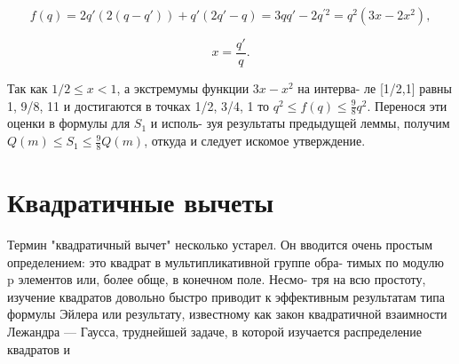 \begin{myproof}
$$f(q) = 2q'(2(q - q')) + q'(2q' - q) = 3qq' - 2q^{'2} = q^{2}(3x - 2x^{2}), $$ \par 
$$x = \frac{q'}{q}. $$ \par 

Так как $1/2 \leqslant x < 1$, а экстремумы функции $3x - x^{2}$ на интерва- \linebreak \indent ле [1/2,1] равны 1, 9/8, 11 и достигаются в точках 1/2, 3/4, 1 то \linebreak \indent $q^2 \leqslant f(q) \leqslant\frac{9}{8}q^{2}.$ Перенося эти оценки в формулы для $S_{1}$ и исполь- \linebreak \indent зуя результаты предыдущей леммы, получим $Q(m) \leqslant S_{1} \leqslant \frac{9}{8}Q(m)$, \linebreak \indent откуда и следует искомое утверждение. \par 
\end{myproof}
\section{Квадратичные вычеты}

Термин "квадратичный вычет" несколько устарел. Он вводится очень \linebreak простым определением: это квадрат в мультипликативной группе обра- \linebreak тимых по модулю p элементов или, более обще, в конечном поле. Несмо- \linebreak тря на всю простоту, изучение квадратов довольно быстро приводит \linebreak к эффективным результатам типа формулы Эйлера или результату, \linebreak известному как закон квадратичной взаимности Лежандра --- Гаусса, труднейшей задаче, в которой изучается распределение квадратов и \linebreak \newpage 


